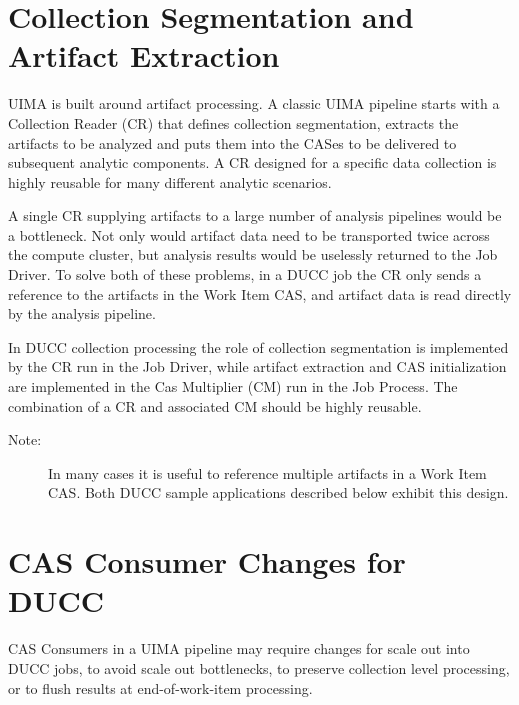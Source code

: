 \section{Collection Segmentation and Artifact Extraction}

UIMA is built around artifact processing. A classic UIMA pipeline starts with
a Collection Reader (CR) that defines collection segmentation, extracts the artifacts
to be analyzed and puts them into the CASes to be delivered to subsequent analytic components. 
A CR designed for a specific data collection is highly reusable
for many different analytic scenarios.

A single CR supplying artifacts to a large number of analysis pipelines 
would be a bottleneck. Not only would artifact data need to be transported twice across
the compute cluster, but analysis results would be uselessly returned to the Job Driver.
To solve both of these problems, in a DUCC job the CR only sends a reference
to the artifacts in the Work Item CAS, and artifact data is read directly by the analysis pipeline.

In DUCC collection processing the role of collection segmentation is
implemented by the CR run in the Job Driver, while
artifact extraction and CAS initialization are implemented in the Cas Multiplier
(CM) run in the Job Process. The combination of a CR and associated CM 
should be highly reusable. 

\begin{description}
    \item[Note:] In many cases it is useful to reference multiple artifacts in a
      Work Item CAS. Both DUCC sample applications described below exhibit this design.
\end{description}

\section{CAS Consumer Changes for DUCC}

CAS Consumers in a UIMA pipeline may require changes for scale out into DUCC
jobs, to avoid scale out bottlenecks, to preserve collection level
processing, or to flush results at end-of-work-item processing.
   
